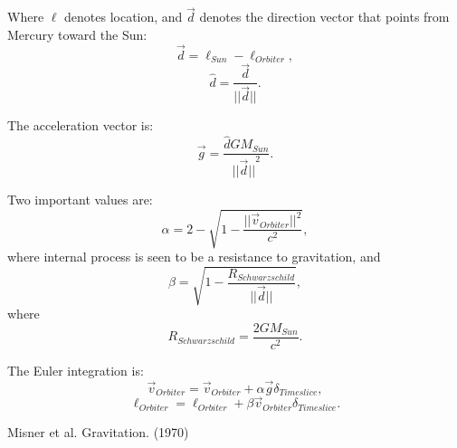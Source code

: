 \documentclass[12pt]{article}
\begin{document}
Where $\ell$ denotes location, and $\vec{d}$ denotes the direction vector that points from Mercury toward the Sun:
\begin{equation}
\vec{d} = \ell_{Sun} - \ell_{Orbiter},	
\end{equation}
\begin{equation}
\hat{d} = \frac{\vec{d}}{\lvert\lvert \vec{d} \rvert\rvert}.
\end{equation}

The acceleration vector is:
\begin{equation}
\vec{g} =  \frac{\hat{d} G M_{Sun}}{{\lvert\lvert \vec{d} \rvert\rvert}^2}.
\end{equation}



Two important values are:
\begin{equation}
\alpha = 2 - \sqrt{1 - \frac{\lvert\lvert \vec{v}_{Orbiter}\rvert\rvert^2}{c^2}},
\end{equation}
where internal process is seen to be a resistance to gravitation, and
\begin{equation}
\beta = \sqrt{1 - \frac{R_{Schwarzschild}}{\lvert \lvert \vec{d} \rvert \rvert}},
\end{equation}
where
\begin{equation}
R_{Schwarzschild} = \frac{2GM_{Sun}}{c^2}.
\end{equation}



The Euler integration is:
\begin{equation}
\vec{v}_{Orbiter} = \vec{v}_{Orbiter} + \alpha \vec{g} \delta_{Timeslice},
\end{equation}
\begin{equation}
\ell_{Orbiter} = \ell_{Orbiter} + \beta \vec{v}_{Orbiter} \delta_{Timeslice}.
\end{equation}






\begin{thebibliography}{9}


 Misner et al. Gravitation. (1970)






\end{thebibliography}
\end{document}
